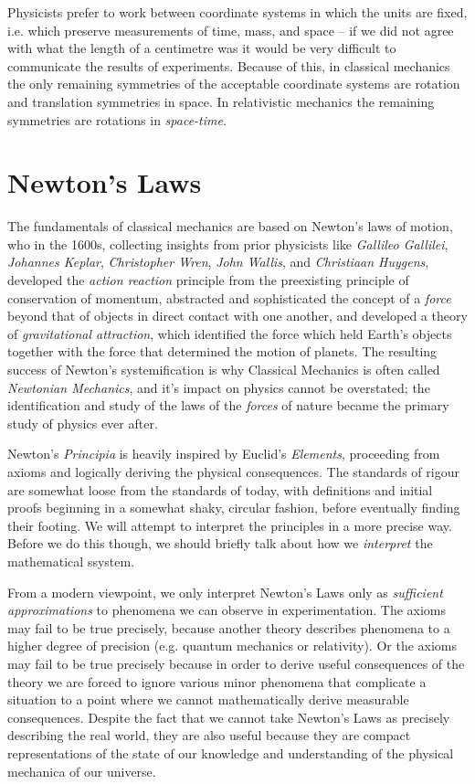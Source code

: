 Physicists prefer to work between coordinate systems in which the units are fixed, i.e. which preserve measurements of time, mass, and space -- if we did not agree with what the length of a centimetre was it would be very difficult to communicate the results of experiments. Because of this, in classical mechanics the only remaining symmetries of the acceptable coordinate systems are rotation and translation symmetries in space. In relativistic mechanics the remaining symmetries are rotations in \emph{space-time}.

\chapter{Newton's Laws}

The fundamentals of classical mechanics are based on Newton's laws of motion, who in the 1600s, collecting insights from prior physicists like \emph{Gallileo Gallilei}, \emph{Johannes Keplar}, \emph{Christopher Wren}, \emph{John Wallis}, and \emph{Christiaan Huygens}, developed the \emph{action reaction} principle from the preexisting principle of conservation of momentum, abstracted and sophisticated the concept of a \emph{force} beyond that of objects in direct contact with one another, and developed a theory of \emph{gravitational attraction}, which identified the force which held Earth's objects together with the force that determined the motion of planets. The resulting success of Newton's systemification is why Classical Mechanics is often called \emph{Newtonian Mechanics}, and it's impact on physics cannot be overstated; the identification and study of the laws of the \emph{forces} of nature became the primary study of physics ever after.

Newton's \emph{Principia} is heavily inspired by Euclid's \emph{Elements}, proceeding from axioms and logically deriving the physical consequences. The standards of rigour are somewhat loose from the standards of today, with definitions and initial proofs beginning in a somewhat shaky, circular fashion, before eventually finding their footing. We will attempt to interpret the principles in a more precise way. Before we do this though, we should briefly talk about how we \emph{interpret} the mathematical ssystem.

From a modern viewpoint, we only interpret Newton's Laws only as \emph{sufficient approximations} to phenomena we can observe in experimentation. The axioms may fail to be true precisely, because another theory describes phenomena to a higher degree of precision (e.g. quantum mechanics or relativity). Or the axioms may fail to be true precisely because in order to derive useful consequences of the theory we are forced to ignore various minor phenomena that complicate a situation to a point where we cannot mathematically derive measurable consequences. Despite the fact that we cannot take Newton's Laws as precisely describing the real world, they are also useful because they are compact representations of the state of our knowledge and understanding of the physical mechanica of our universe.

